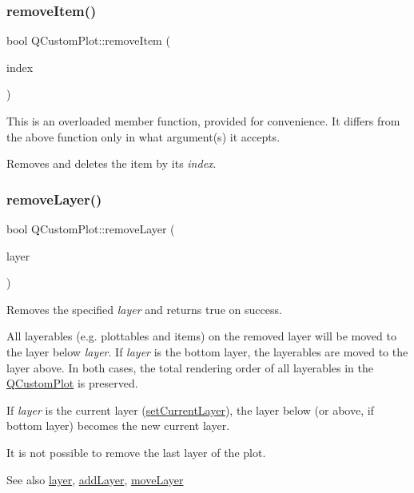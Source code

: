 \subsubsection{\texorpdfstring{remove\+Item()}{removeItem()}\hspace{0.1cm}{\footnotesize\ttfamily [2/2]}}
{\footnotesize\ttfamily bool Q\+Custom\+Plot\+::remove\+Item (\begin{DoxyParamCaption}\item[{int}]{index }\end{DoxyParamCaption})}

This is an overloaded member function, provided for convenience. It differs from the above function only in what argument(s) it accepts.

Removes and deletes the item by its {\itshape index}. \mbox{\label{class_q_custom_plot_a40f75e342c5eaab6a86066a42a0e2a94}} 
\subsubsection{\texorpdfstring{remove\+Layer()}{removeLayer()}}
{\footnotesize\ttfamily bool Q\+Custom\+Plot\+::remove\+Layer (\begin{DoxyParamCaption}\item[{\hyperlink{class_q_c_p_layer}{Q\+C\+P\+Layer} $\ast$}]{layer }\end{DoxyParamCaption})}

Removes the specified {\itshape layer} and returns true on success.

All layerables (e.\+g. plottables and items) on the removed layer will be moved to the layer below {\itshape layer}. If {\itshape layer} is the bottom layer, the layerables are moved to the layer above. In both cases, the total rendering order of all layerables in the \hyperlink{class_q_custom_plot}{Q\+Custom\+Plot} is preserved.

If {\itshape layer} is the current layer (\hyperlink{class_q_custom_plot_a73a6dc47c653bb6f8f030abca5a11852}{set\+Current\+Layer}), the layer below (or above, if bottom layer) becomes the new current layer.

It is not possible to remove the last layer of the plot.

\begin{DoxySeeAlso}{See also}
\hyperlink{class_q_custom_plot_a0a96244e7773b242ef23c32b7bdfb159}{layer}, \hyperlink{class_q_custom_plot_ad5255393df078448bb6ac83fa5db5f52}{add\+Layer}, \hyperlink{class_q_custom_plot_ae896140beff19424e9e9e02d6e331104}{move\+Layer} 
\end{DoxySeeAlso}
\mbox{\label{class_q_custom_plot_af3dafd56884208474f311d6226513ab2}} 
